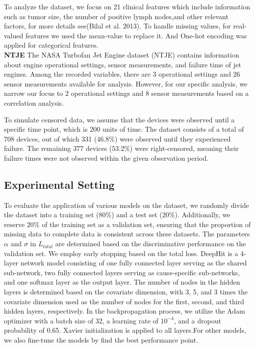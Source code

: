 \documentclass[conference]{IEEEconf}
\begin{document}
To analyze the dataset, we focus on 21 clinical features which include information such as tumor size, the number of positive lymph nodes,and other relevant factors, for more details see(Bilal et al. 2013). To handle missing values, for real-valued features we used the mean-value to replace it. And 	One-hot encoding was applied for categorical features.
\\

\textbf{NTJE} The NASA Turbofan Jet Engine dataset (NTJE) contains information about engine operational settings, sensor measurements, and failure time of jet engines. Among the recorded variables, there are 3 operational settings and 26 sensor measurements available for analysis. However, for our specific analysis, we narrow our focus to 2 operational settings and 8 sensor measurements based on a correlation analysis.

To simulate censored data, we assume that the devices were observed until a specific time point, which is 200 units of time. The dataset consists of a total of 708 devices, out of which 331 ($46.8\%$) were observed until they experienced failure. The remaining 377 devices ($53.2\%$) were right-censored, meaning their failure times were not observed within the given observation period.
\subsection{Experimental Setting}
To evaluate the application of various models on the dataset, we randomly divide the dataset into a training set ($80\%$) and a test set ($20\%$). Additionally, we reserve $20\%$ of the training set as a validation set, ensuring that the proportion of missing data to complete data is consistent across these datasets. The parameters $\alpha$ and $\sigma$ in $L_{total}$ are determined based on the discriminative performance on the validation set. We employ early stopping based on the total loss. DeepHit is a 4-layer network model consisting of one fully connected layer serving as the shared sub-network, two fully connected layers serving as cause-specific sub-networks, and one softmax layer as the output layer. The number of nodes in the hidden layers is determined based on the covariate dimension, with 3, 5, and 3 times the covariate dimension used as the number of nodes for the first, second, and third hidden layers, respectively. In the backpropagation process, we utilize the Adam optimizer with a batch size of 32, a learning rate of $10^{-4}$, and a dropout probability of 0.65. Xavier initialization is applied to all layers.For other models, we also fine-tune the models by find the best performance point.
\end{document}
